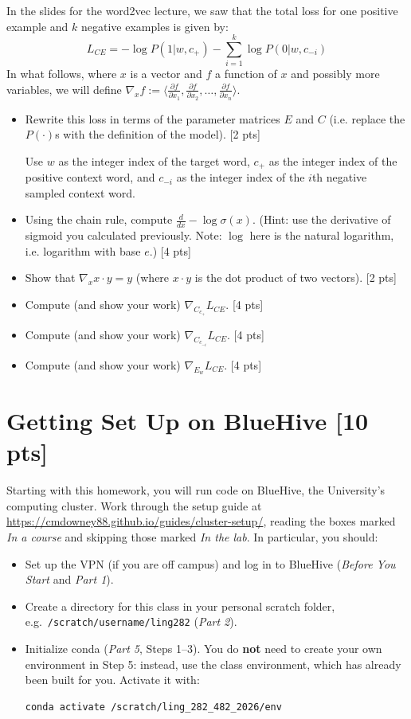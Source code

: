 \documentclass[11pt]{article}
\begin{document}
\vspace{2em}
  In the slides for the word2vec lecture, we saw that the total loss for one positive example and $k$ negative examples is given by:
$$ L_{CE} = -\log P(1 | w, c_+) - \sum_{i=1}^k \log P(0 | w, c_{-i})$$
In what follows, where $x$ is a vector and $f$ a function of $x$ and possibly more variables, we will define $\nabla_x f := \langle \frac{\partial f}{\partial x_1} , \frac{\partial f}{\partial x_2}, \dots , \frac{\partial f}{\partial x_n} \rangle$.
\begin{itemize}
  \item Rewrite this loss in terms of the parameter matrices $E$ and $C$ (i.e. replace the $P(\cdot)$s with the definition of the model). [2 pts]

        Use $w$ as the integer index of the target word, $c_+$ as the integer index of the positive context word, and $c_{-i}$ as the integer index of the $i$th negative sampled context word.
  \item Using the chain rule, compute $\frac{d}{dx} -\log\sigma(x)$.  (Hint: use the derivative of sigmoid you calculated previously.  Note: $\log$ here is the natural logarithm, i.e. logarithm with base $e$.) [4 pts]
  \item Show that $\nabla_x x \cdot y = y$ (where $x \cdot y$ is the dot product of two vectors). [2 pts]
  \item Compute (and show your work) $\nabla_{C_{c_+}} L_{CE}$. [4 pts]
  \item Compute (and show your work) $\nabla_{C_{c_{-i}}} L_{CE}$. [4 pts]
  \item Compute (and show your work) $\nabla_{E_w} L_{CE}$. [4 pts]
\end{itemize}

\newpage
\section{Getting Set Up on BlueHive [10 pts]}

Starting with this homework, you will run code on BlueHive, the University's computing cluster. Work through the setup guide at \url{https://cmdowney88.github.io/guides/cluster-setup/}, reading the boxes marked \emph{In a course} and skipping those marked \emph{In the lab}. In particular, you should:
\begin{itemize}
  \item Set up the VPN (if you are off campus) and log in to BlueHive (\textit{Before You Start} and \textit{Part 1}).
  \item Create a directory for this class in your personal scratch folder, e.g.\ \texttt{/scratch/username/ling282} (\textit{Part 2}).
  \item Initialize conda (\textit{Part 5}, Steps 1--3). You do \textbf{not} need to create your own environment in Step 5: instead, use the class environment, which has already been built for you. Activate it with:
\begin{verbatim}
conda activate /scratch/ling_282_482_2026/env
\end{verbatim}
\end{itemize}
\end{document}

